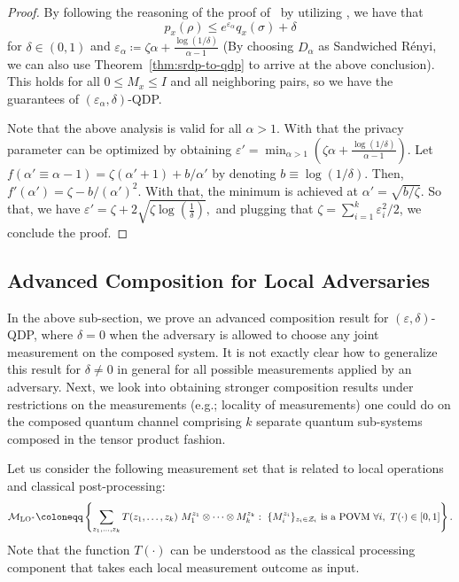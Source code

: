\documentclass[11pt]{article}
\theoremstyle{plain}
\theoremstyle{remark}
\begin{document}
\begin{proof}
By following the reasoning of the proof of~\cite[Proposition~3]{mironov2017renyi} by utilizing \cite[Proposition~10]{mironov2017renyi}, we have that 
\begin{equation}
    p_x(\rho) \leq e^{\varepsilon_\alpha} q_x(\sigma) + \delta
\end{equation}
for $\delta \in (0,1)$ and $\varepsilon_\alpha \coloneqq \zeta \alpha + \frac{\log(1/\delta)}{\alpha-1}$ (By choosing $D_\alpha$ as Sandwiched R\'enyi, we can also use Theorem~\ref{thm:srdp-to-qdp} to arrive at the above conclusion). This holds for all $0 \leq M_x \leq I$ and all neighboring pairs, so we have the guarantees of $(\varepsilon_\alpha, \delta)$-QDP. 

Note that the above analysis is valid for all $\alpha >1$. With that the privacy parameter can be optimized by obtaining 
$
    \varepsilon' = \min_{\alpha>1} \left(\zeta \alpha + \frac{\log(1/\delta)}{\alpha-1} \right). 
$
Let $f(\alpha'\equiv\alpha-1)= \zeta (\alpha'+1)  + b/\alpha'$ by denoting $b \equiv \log(1/\delta) $. Then, 
   $ f'(\alpha')=\zeta- b/(\alpha')^2.$
With that, the minimum is achieved at $    \alpha' = \sqrt{b/ \zeta}  $. 
So that, we have 
$
    \varepsilon' = \zeta + 2 \sqrt{ \zeta \log\!\left( \frac{1}{\delta} \right) },
$
and plugging that $\zeta= \sum_{i=1}^k \varepsilon_i^2 /2$, we conclude the proof.
\end{proof}

\subsection{Advanced Composition for Local Adversaries}


In the above sub-section, we prove an advanced composition result for $(\varepsilon, \delta)$-QDP, where $\delta=0$ when the adversary is allowed to choose any joint measurement on the composed system. It is not exactly clear how to generalize this result for $\delta \neq 0$ in general for all possible measurements applied by an adversary. Next, we look into obtaining stronger composition results under restrictions on the measurements (e.g.; locality of measurements) one could do on the composed quantum channel comprising $k$ separate quantum sub-systems composed in the tensor product fashion.

Let us consider the following measurement set that is related to local operations and classical post-processing:
\begin{equation}
    \mathcal{M}_{\operatorname{LO}^*} \coloneqq \left\{ \sum_{z_1,\ldots,z_k} T(z_1,\dots,z_k) \  M_1^{z_1}\otimes\cdots\otimes M_k^{z_k} :  \ \{M_i^{z_i}\}_{z_i\in\mathcal Z_i} \textnormal{ is a POVM } \forall i,  \ T(\cdot) \in [0,1] \right\}. 
\end{equation}
Note that the function $T(\cdot)$ can be understood as the classical processing component that takes each local measurement outcome as input.
\end{document}
